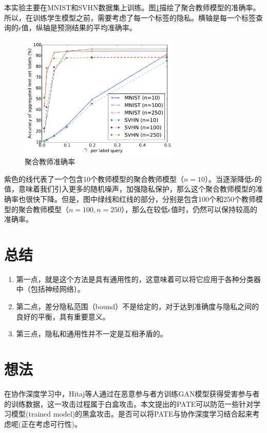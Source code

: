 \documentclass[a4paper]{article}
\begin{document}
本实验主要在MNIST和SVHN数据集上训练。图\ref{fig:teacher-accuracy}描绘了聚合教师模型的准确率。所以，在训练学生模型之前，需要考虑了每一个标签的隐私。横轴是每一个标签查询的$\epsilon$值，纵轴是预测结果的平均准确率。
\begin{figure}
\includegraphics[width = 3in]{fig/lap-scale-accuracy.pdf}
\caption{聚合教师准确率}
\label{fig:teacher-accuracy}
\end{figure}
紫色的线代表了一个包含10个教师模型的聚合教师模型（$n=10$）。当逐渐降低$\epsilon$的值，意味着我们引入更多的随机噪声，加强隐私保护，那么这个聚合教师模型的准确率也很快下降。但是，图中绿线和红线的部分，分别是包含100个和250个教师模型的聚合教师模型（$n=100, n=250$），那么在较低$\epsilon$值时，仍然可以保持较高的准确率。

\section{总结}
\begin{enumerate}
\item 第一点，就是这个方法是具有通用性的，这意味着可以将它应用于各种分类器中（包括神经网络）。
\item 第二点，差分隐私范围（bound）不是给定的，对于达到准确度与隐私之间的良好的平衡，具有重要意义。
\item 第三点，隐私和通用性并不一定是互相矛盾的。
\end{enumerate}

\section{想法}
在协作深度学习中，Hitaj等人通过在恶意参与者方训练GAN模型获得受害参与者的训练数据\cite{hitaj2017deep}，这一攻击过程属于白盒攻击。本文提出的PATE可以防范一些针对学习模型(trained model)的黑盒攻击。是否可以将PATE与协作深度学习结合起来考虑呢(正在考虑可行性)。



\end{document}
